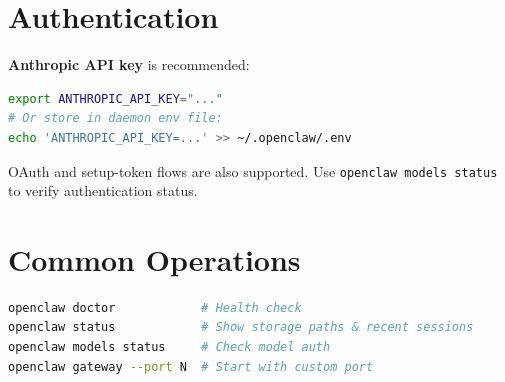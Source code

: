 \section{Authentication}

\textbf{Anthropic API key} is recommended:

\begin{lstlisting}[language=bash]
export ANTHROPIC_API_KEY="..."
# Or store in daemon env file:
echo 'ANTHROPIC_API_KEY=...' >> ~/.openclaw/.env
\end{lstlisting}

OAuth and setup-token flows are also supported. Use \texttt{openclaw models status} to verify authentication status.

\section{Common Operations}

\begin{lstlisting}[language=bash]
openclaw doctor            # Health check
openclaw status            # Show storage paths & recent sessions
openclaw models status     # Check model auth
openclaw gateway --port N  # Start with custom port
\end{lstlisting}
